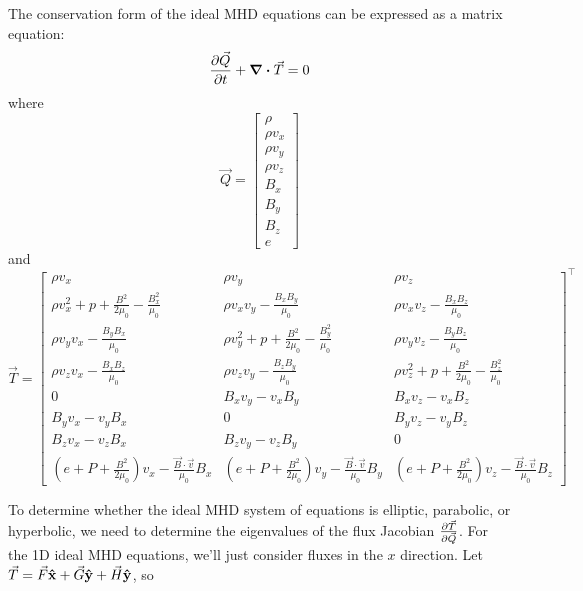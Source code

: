 \documentclass[10pt,letterpaper,notitlepage]{report}
\begin{document}
The conservation form of the ideal MHD equations can be expressed as a matrix equation:
\begin{equation}
\pdv{\vec Q}{t} + \div \vec{T} = 0
\end{equation}
where
\begin{equation}
\vec Q = \begin{bmatrix}
\rho \\
\rho v_x \\
\rho v_y \\
\rho v_z \\
B_x \\
B_y \\
B_z \\
e
\end{bmatrix}
\end{equation}
and
\begin{equation}
\vec T = \begin{bmatrix}
\rho v_x & \rho v_y & \rho v_z \\
\rho v_x^2 + p + \frac{B^2}{2 \mu_0} - \frac{B_x ^2}{\mu_0} & \rho v_x v_y - \frac{B_x B_y}{\mu_0} & \rho v_x v_z - \frac{B_x B_z}{\mu_0} \\
\rho v_y v_x - \frac{B_y B_x}{\mu_0} & \rho v_y ^2 + p + \frac{B^2}{2 \mu_0} - \frac{B_y ^2}{\mu_0} & \rho v_y v_z - \frac{B_y B_z}{\mu_0} \\
\rho v_z v_x - \frac{B_x B_z}{\mu_0} & \rho v_z v_y - \frac{B_z B_y}{\mu_0} & \rho v_z ^2 + p + \frac{B^2}{2 \mu_0} - \frac{B_z ^2}{\mu_0} \\
0 & B_x v_y - v_x B_y & B_x v_z - v_x B_z  \\
B_y v_x - v_y B_x  & 0 & B_y v_z - v_y B_z  \\
B_z v_x - v_z B_x & B_z v_y - v_z B_y & 0 \\
\left( e + P + \frac{B^2}{2 \mu_0} \right) v_x - \frac{\vec B \cdot \vec v}{\mu_0} B_x & \left( e + P + \frac{B^2}{2 \mu_0} \right) v_y - \frac{\vec B \cdot \vec v}{\mu_0} B_y & \left( e + P + \frac{B^2}{2 \mu_0} \right) v_z - \frac{\vec B \cdot \vec v}{\mu_0} B_z
\end{bmatrix} ^ \top
\end{equation}

To determine whether the ideal MHD system of equations is elliptic, parabolic, or hyperbolic, we need to determine the eigenvalues of the flux Jacobian $\pdv{\vec T}{\vec Q}$. For the 1D ideal MHD equations, we'll just consider fluxes in the $x$ direction. Let $\vec T = \vec F \vu x + \vec G \vu y + \vec H \vu y$, so
\end{document}
